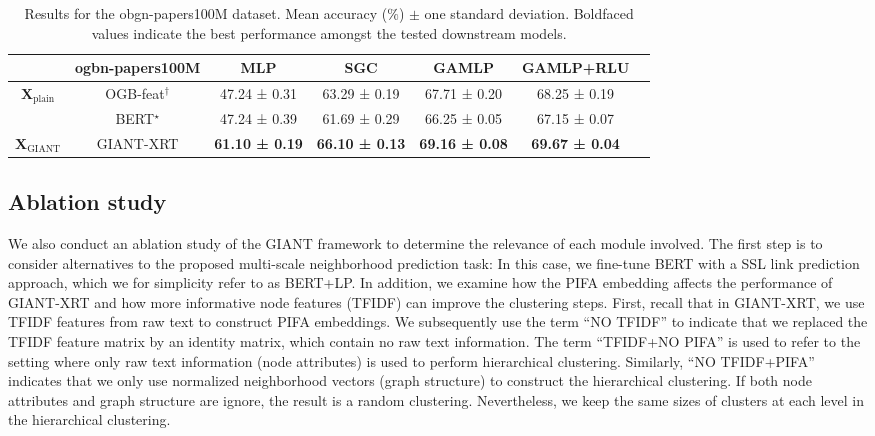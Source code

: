 \documentclass{article} %
\begin{document}
\begin{table}[t]
\setlength{\tabcolsep}{2.75pt}
\caption{Results for the obgn-papers100M dataset. Mean accuracy ($\%$) $\pm$ one standard deviation. Boldfaced values indicate the best performance amongst the tested downstream models.}
\vspace{0.1cm}
\label{tab:ogbn-papers100M}
\centering
\small
\begin{tabular}{@{}ccccccc@{}}
    \toprule
    & ogbn-papers100M & MLP & SGC & GAMLP & GAMLP+RLU \\
    \midrule
    \multicolumn{1}{c}{\multirow{2}{*}{$\mathbf{X}_{\text{plain}}$}} & OGB-feat$^\dagger$
        & 47.24 ± 0.31 & 63.29 ± 0.19 & 67.71 ± 0.20 & 68.25 ± 0.19 \\
    \multicolumn{1}{c}{} & BERT$^\star$
        & 47.24 ± 0.39 & 61.69 ± 0.29 & 66.25 ± 0.05 & 67.15 ± 0.07 \\
    \midrule
    $\mathbf{X}_{\text{GIANT}}$ & GIANT-XRT
        & \textbf{61.10 ± 0.19} & \textbf{66.10 ± 0.13} & \textbf{69.16 ± 0.08} & \textbf{69.67 ± 0.04} \\
    \bottomrule
\end{tabular}
\vspace{-0.2cm}
\end{table}

\subsection{Ablation study}
We also conduct an ablation study of the GIANT framework to determine the relevance of each module involved. The first step is to consider alternatives to the proposed multi-scale neighborhood prediction task: In this case, we fine-tune BERT with a SSL link prediction approach, which we for simplicity refer to as BERT+LP.
In addition, we examine how the PIFA embedding affects the performance of GIANT-XRT and how more informative node features (TFIDF) can improve the clustering steps. First, recall that in GIANT-XRT, we use TFIDF features from raw text to construct PIFA embeddings. We subsequently use the term ``NO TFIDF'' to indicate that we replaced the TFIDF feature matrix by an identity matrix, which contain no raw text information. The term ``TFIDF+NO PIFA'' is used to refer to the setting where only raw text information (node attributes) is used to perform hierarchical clustering. Similarly, ``NO TFIDF+PIFA'' indicates that we  only use normalized neighborhood vectors (graph structure) to construct the hierarchical clustering. If both node attributes and graph structure are ignore, the result is a random clustering. Nevertheless, we keep the same sizes of clusters at each level in the hierarchical clustering.
\end{document}
